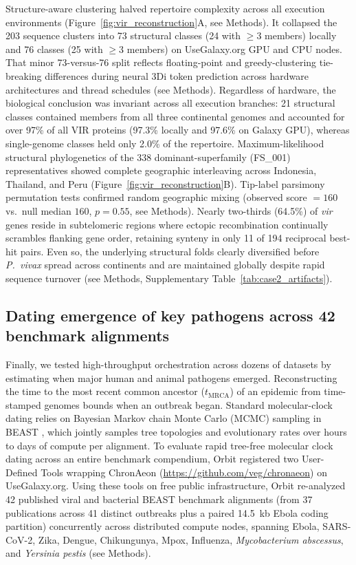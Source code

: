\documentclass[11pt,letterpaper]{article}
\begin{document}
Structure-aware clustering halved repertoire complexity across all execution environments (Figure~\ref{fig:vir_reconstruction}A, see Methods). It collapsed the 203 sequence clusters into 73 structural classes (24 with $\ge 3$ members) locally and 76 classes (25 with $\ge 3$ members) on UseGalaxy.org GPU and CPU nodes. That minor 73-versus-76 split reflects floating-point and greedy-clustering tie-breaking differences during neural 3Di token prediction across hardware architectures and thread schedules (see Methods). Regardless of hardware, the biological conclusion was invariant across all execution branches: 21 structural classes contained members from all three continental genomes and accounted for over 97\% of all VIR proteins (97.3\% locally and 97.6\% on Galaxy GPU), whereas single-genome classes held only 2.0\% of the repertoire. Maximum-likelihood structural phylogenetics of the 338 dominant-superfamily (FS\_001) representatives showed complete geographic interleaving across Indonesia, Thailand, and Peru (Figure~\ref{fig:vir_reconstruction}B). Tip-label parsimony permutation tests confirmed random geographic mixing (observed score $= 160$ vs.\ null median $160$, $p = 0.55$, see Methods). Nearly two-thirds (64.5\%) of \textit{vir} genes reside in subtelomeric regions where ectopic recombination continually scrambles flanking gene order, retaining synteny in only 11 of 194 reciprocal best-hit pairs. Even so, the underlying structural folds clearly diversified before \textit{P.\ vivax} spread across continents and are maintained globally despite rapid sequence turnover (see Methods, Supplementary Table~\ref{tab:case2_artifacts}).

\subsection{Dating emergence of key pathogens across 42 benchmark alignments}

Finally, we tested high-throughput orchestration across dozens of datasets by estimating when major human and animal pathogens emerged. Reconstructing the time to the most recent common ancestor ($t_{\mathrm{MRCA}}$) of an epidemic from time-stamped genomes bounds when an outbreak began. Standard molecular-clock dating relies on Bayesian Markov chain Monte Carlo (MCMC) sampling in BEAST \cite{suchard2018}, which jointly samples tree topologies and evolutionary rates over hours to days of compute per alignment. To evaluate rapid tree-free molecular clock dating across an entire benchmark compendium, Orbit registered two User-Defined Tools wrapping ChronAeon (\url{https://github.com/veg/chronaeon}) \cite{pond2026hyphaeon} on UseGalaxy.org. Using these tools on free public infrastructure, Orbit re-analyzed 42 published viral and bacterial BEAST benchmark alignments (from 37 publications across 41 distinct outbreaks plus a paired 14.5~kb Ebola coding partition) concurrently across distributed compute nodes, spanning Ebola, SARS-CoV-2, Zika, Dengue, Chikungunya, Mpox, Influenza, \textit{Mycobacterium abscessus}, and \textit{Yersinia pestis} (see Methods).
\end{document}
